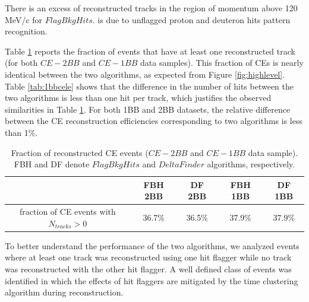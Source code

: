 There is an excess of reconstructed tracks in the region of momentum above 120 MeV/c 
for $FlagBkgHits$. 
 is due to unflagged proton and deuteron hits  pattern recognition.

Table \ref{tab:recoeffcele} reports 
the fraction of  events  that have at least one 
reconstructed track (for both 
$CE-2BB$ and $CE-1BB$ data samples). 
This fraction of CEs is nearly identical 
between the two algorithms, 
as expected from Figure \ref{fig:highlevel}.
Table \ref{tab:1bbcele} shows 
that the difference in the number of 
hits between the two algorithms 
is less than one hit per track, which 
justifies the observed similarities in 
Table \ref{tab:recoeffcele}.
For both 1BB and 2BB datasets, the relative difference between the 
CE reconstruction efficiencies corresponding to two algorithms is less than 1\%.



\begin{center}
    \begin{table}[h!]
    \centering
    \renewcommand{\arraystretch}{1.}
    \begin{tabular}{| c | c | c | c | c |} 
    \hline
    & FBH 2BB & DF 2BB & FBH 1BB & DF 1BB  \\
    \hline
    fraction of CE events with $N_{tracks}>0$ & 36.7\% & 36.5\% & 37.9\% & 37.9\%\\
    \hline
    \end{tabular}
    \caption{Fraction of reconstructed CE events ($CE-2BB$ and $CE-1BB$ data sample). FBH and DF denote  
    $FlagBkgHits$ and $DeltaFinder$ algorithms, respectively.}
    \label{tab:recoeffcele}
\end{table}
\end{center}

To better understand the performance of the 
two algorithms, we analyzed events where at least one 
track was reconstructed using one hit flagger while no track  
was reconstructed with the other hit flagger. A well defined class 
of events was identified in which the effects of hit flaggers are 
mitigated by the time clustering algorithm during  reconstruction.


